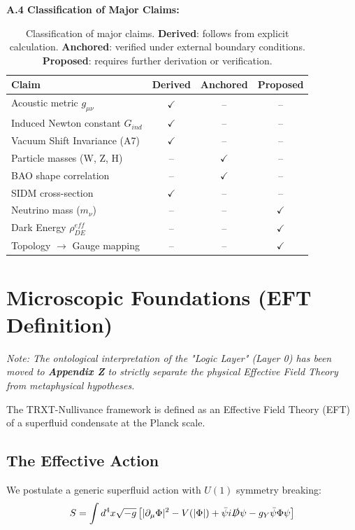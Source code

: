 \documentclass[a4paper,12pt]{article}
\begin{document}
\textbf{A.4 Classification of Major Claims:}
\begin{table}[H]
\centering
\small
\begin{tabular}{lccc}
\toprule
\textbf{Claim} & \textbf{Derived} & \textbf{Anchored} & \textbf{Proposed} \\
\midrule
Acoustic metric $g_{\mu\nu}$ & $\checkmark$ & -- & -- \\
Induced Newton constant $G_{ind}$ & $\checkmark$ & -- & -- \\
Vacuum Shift Invariance (A7) & $\checkmark$ & -- & -- \\
Particle masses (W, Z, H) & -- & $\checkmark$ & -- \\
BAO shape correlation & -- & $\checkmark$ & -- \\
SIDM cross-section & $\checkmark$ & -- & -- \\
Neutrino mass ($m_\nu$) & -- & -- & $\checkmark$ \\
Dark Energy $\rho_{DE}^{eff}$ & -- & -- & $\checkmark$ \\
Topology $\to$ Gauge mapping & -- & -- & $\checkmark$ \\
\bottomrule
\end{tabular}
\caption{Classification of major claims. \textbf{Derived}: follows from explicit calculation. \textbf{Anchored}: verified under external boundary conditions. \textbf{Proposed}: requires further derivation or verification.}
\end{table}

\section{Microscopic Foundations (EFT Definition)}

\textit{Note: The ontological interpretation of the "Logic Layer" (Layer 0) has been moved to \textbf{Appendix Z} to strictly separate the physical Effective Field Theory from metaphysical hypotheses.}

The TRXT-Nullivance framework is defined as an Effective Field Theory (EFT) of a superfluid condensate at the Planck scale.
\subsection{The Effective Action}
We postulate a generic superfluid action with $U(1)$ symmetry breaking:
\begin{equation}
    S = \int d^4x \sqrt{-g} \left[ |\partial_\mu \Phi|^2 - V(|\Phi|) + \bar{\psi} i \slashed{D} \psi - g_Y \bar{\psi} \Phi \psi \right]
\end{equation}
\end{document}
